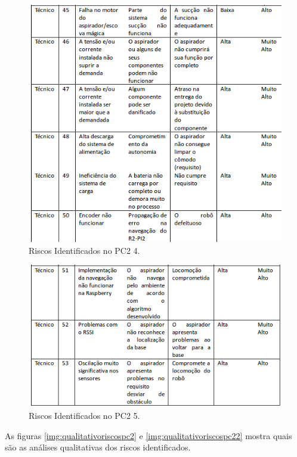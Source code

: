 \begin{figure}[H]
	\centering
	\includegraphics[scale=0.9]{figuras/riscos_pc2_4.png}
	\caption{Riscos Identificados no PC2 4.}
	\label{img:riscospc24}
\end{figure}

\begin{figure}[H]
	\centering
	\includegraphics[scale=0.9]{figuras/riscos_pc2_5.png}
	\caption{Riscos Identificados no PC2 5.}
	\label{img:riscospc25}
\end{figure}

As figuras \ref{img:qualitativoriscospc2} e \ref{img:qualitativoriscospc22} mostra quais são as análises qualitativas dos riscos identificados.

